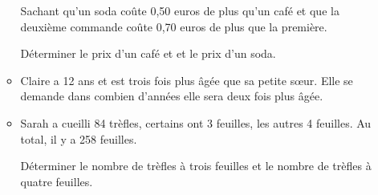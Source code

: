 \begin{itemize}[leftmargin=0.1cm, itemsep=40pt]
\begin{itemize}[leftmargin=1cm, itemsep=1pt]
Sachant qu’un soda coûte 0,50 euros de plus qu’un café et que la deuxième commande coûte 0,70 euros de plus que la première.

Déterminer le prix d’un café et et le prix d’un soda.

		\item 
Claire a 12 ans et est trois fois plus âgée que sa petite sœur.
Elle se demande dans combien d’années elle sera deux fois plus âgée.

		\item 
Sarah a cueilli 84 trèfles, certains ont 3 feuilles, les autres 4 feuilles.
Au total, il y a 258 feuilles.

Déterminer le nombre de trèfles à trois feuilles et le nombre de trèfles à quatre feuilles.


	\end{itemize}

	\end{itemize}
